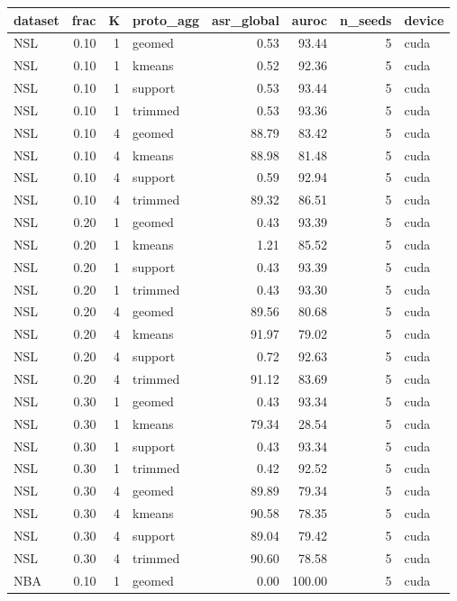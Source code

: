 \begin{tabular}{lrrlrrrl}
\toprule
dataset & frac & K & proto\_agg & asr\_global & auroc & n\_seeds & device \\
\midrule
NSL & 0.10 & 1 & geomed & 0.53 & 93.44 & 5 & cuda \\
NSL & 0.10 & 1 & kmeans & 0.52 & 92.36 & 5 & cuda \\
NSL & 0.10 & 1 & support & 0.53 & 93.44 & 5 & cuda \\
NSL & 0.10 & 1 & trimmed & 0.53 & 93.36 & 5 & cuda \\
NSL & 0.10 & 4 & geomed & 88.79 & 83.42 & 5 & cuda \\
NSL & 0.10 & 4 & kmeans & 88.98 & 81.48 & 5 & cuda \\
NSL & 0.10 & 4 & support & 0.59 & 92.94 & 5 & cuda \\
NSL & 0.10 & 4 & trimmed & 89.32 & 86.51 & 5 & cuda \\
NSL & 0.20 & 1 & geomed & 0.43 & 93.39 & 5 & cuda \\
NSL & 0.20 & 1 & kmeans & 1.21 & 85.52 & 5 & cuda \\
NSL & 0.20 & 1 & support & 0.43 & 93.39 & 5 & cuda \\
NSL & 0.20 & 1 & trimmed & 0.43 & 93.30 & 5 & cuda \\
NSL & 0.20 & 4 & geomed & 89.56 & 80.68 & 5 & cuda \\
NSL & 0.20 & 4 & kmeans & 91.97 & 79.02 & 5 & cuda \\
NSL & 0.20 & 4 & support & 0.72 & 92.63 & 5 & cuda \\
NSL & 0.20 & 4 & trimmed & 91.12 & 83.69 & 5 & cuda \\
NSL & 0.30 & 1 & geomed & 0.43 & 93.34 & 5 & cuda \\
NSL & 0.30 & 1 & kmeans & 79.34 & 28.54 & 5 & cuda \\
NSL & 0.30 & 1 & support & 0.43 & 93.34 & 5 & cuda \\
NSL & 0.30 & 1 & trimmed & 0.42 & 92.52 & 5 & cuda \\
NSL & 0.30 & 4 & geomed & 89.89 & 79.34 & 5 & cuda \\
NSL & 0.30 & 4 & kmeans & 90.58 & 78.35 & 5 & cuda \\
NSL & 0.30 & 4 & support & 89.04 & 79.42 & 5 & cuda \\
NSL & 0.30 & 4 & trimmed & 90.60 & 78.58 & 5 & cuda \\
NBA & 0.10 & 1 & geomed & 0.00 & 100.00 & 5 & cuda \\

\end{tabular}
